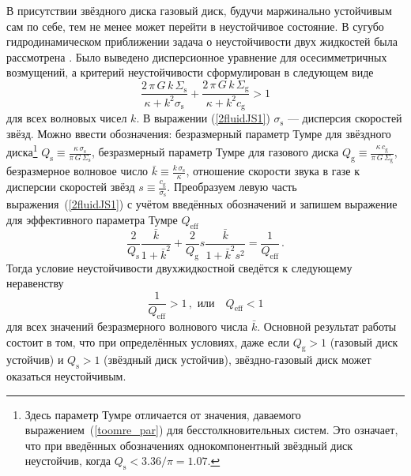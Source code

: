 \documentclass[russian,12pt]{article}
\begin{document}
В присутствии звёздного диска газовый диск, будучи маржинально 
устойчивым сам по себе, тем не менее может перейти в неустойчивое состояние. 
В сугубо гидродинамическом приближении задача о неустойчивости двух 
жидкостей была рассмотрена \cite{JS84}. Было выведено дисперсионное 
уравнение для осесимметричных возмущений, а критерий неустойчивости 
сформулирован в следующем виде
\begin{equation}
\frac{2\,\pi\,G\,k\,\Sigma_\mathrm{s}}{\kappa+k^2 \sigma_\mathrm{s}} + 
\frac{2\,\pi\,G\,k\,\Sigma_\mathrm{g}}{\kappa+k^2 c_\mathrm{g}} > 1
\label{2fluidJS1}
\end{equation}
для всех волновых чисел $k$. В выражении (\ref{2fluidJS1}) 
$\sigma_\mathrm{s}$ --- дисперсия скоростей звёзд. Можно ввести 
обозначения: безразмерный параметр Тумре для звёздного 
диска\footnote{Здесь параметр Тумре отличается от значения, даваемого 
выражением~(\ref{toomre_par}) для бесстолкновительных систем. Это 
означает, что при введённых обозначениях однокомпонентный звёздный диск 
неустойчив, когда $Q_\mathrm{s} < 3.36/\pi = 1.07$.}
$\displaystyle Q_\mathrm{s} \equiv 
\frac{\kappa\,\sigma_\mathrm{s}}{\pi\,G\,\Sigma_\mathrm{s}}$, 
безразмерный параметр Тумре для газового диска  
$\displaystyle Q_\mathrm{g} \equiv 
\frac{\kappa\,c_\mathrm{g}}{\pi\,G\,\Sigma_\mathrm{g}}$, безразмерное 
волновое число 
$\displaystyle \bar{k} \equiv \frac{k\,\sigma_\mathrm{s}}{\kappa}$, 
отношение скорости звука в газе к дисперсии скоростей звёзд 
$\displaystyle s \equiv \frac{c_\mathrm{g}}{\sigma_\mathrm{s}}$. 
Преобразуем левую часть выражения~(\ref{2fluidJS1}) с учётом введённых 
обозначений и запишем выражение для эффективного параметра Тумре 
$Q_\mathrm{eff}$
$$
\frac{2}{Q_\mathrm{s}} \frac{\bar{k}}{1 + \bar{k}^2} + 
\frac{2}{Q_\mathrm{g}} s \frac{\bar{k}}{1 + \bar{k}^2 s^2} = 
\frac{1}{Q_\mathrm{eff}} \, .
$$
Тогда условие неустойчивости двухжидкостной сведётся к следующему 
неравенству
$$
\frac{1}{Q_\mathrm{eff}} > 1 \, , 
\,\, \mbox{или} \,\,\,\,\,\, Q_\mathrm{eff} < 1 
$$
для всех значений безразмерного волнового числа $\bar{k}$.
Основной результат работы \cite{JS84} состоит в том, что при 
определённых условиях, даже если $Q_\mathrm{g} > 1$ (газовый диск 
устойчив) и $Q_\mathrm{s} > 1$ (звёздный диск устойчив), 
звёздно-газовый диск может оказаться неустойчивым.
\end{document}
